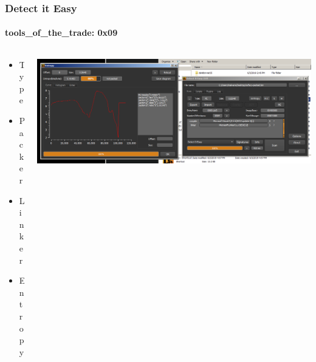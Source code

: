 \documentclass[aspectratio=169]{beamer}
\begin{document}
\begin{frame}
  \frametitle{Detect it Easy}
  \framesubtitle{tools\_of\_the\_trade: 0x09}
  \begin{columns}
    \begin{column}{.2\textwidth}
      \begin{itemize}
      \item{Type}
      \item{Packer}
      \item{Linker}
      \item{Entropy}
      \end{itemize}
    \end{column}
    \hfill
    \begin{column}{.8\textwidth}
      \includegraphics[scale=.98]{detect-it-easy}
    \end{column}
  \end{columns}
\end{frame}
\end{document}
